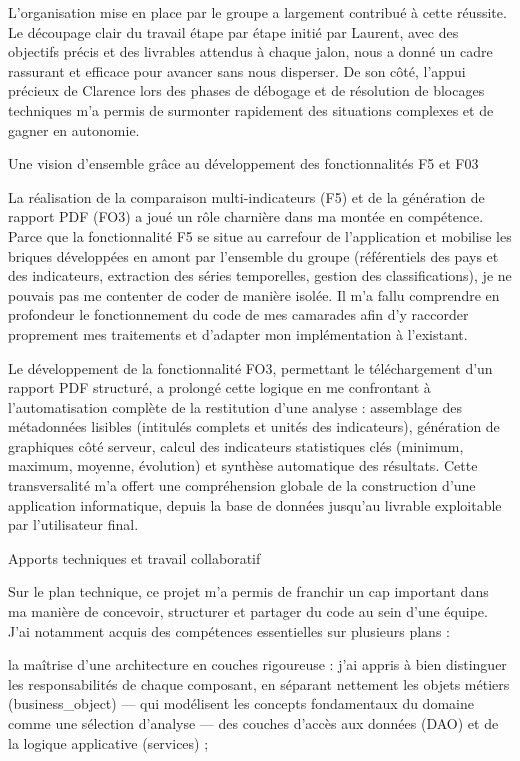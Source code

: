 \documentclass[
  french,
  12pt,
  letterpaper,
  DIV=11,
  numbers=noendperiod]{scrartcl}
\begin{document}
L'organisation mise en place par le groupe a largement contribué à cette
réussite. Le découpage clair du travail étape par étape initié par
Laurent, avec des objectifs précis et des livrables attendus à chaque
jalon, nous a donné un cadre rassurant et efficace pour avancer sans
nous disperser. De son côté, l'appui précieux de Clarence lors des
phases de débogage et de résolution de blocages techniques m'a permis de
surmonter rapidement des situations complexes et de gagner en autonomie.

Une vision d'ensemble grâce au développement des fonctionnalités F5 et
F03

La réalisation de la comparaison multi-indicateurs (F5) et de la
génération de rapport PDF (FO3) a joué un rôle charnière dans ma montée
en compétence. Parce que la fonctionnalité F5 se situe au carrefour de
l'application et mobilise les briques développées en amont par
l'ensemble du groupe (référentiels des pays et des indicateurs,
extraction des séries temporelles, gestion des classifications), je ne
pouvais pas me contenter de coder de manière isolée. Il m'a fallu
comprendre en profondeur le fonctionnement du code de mes camarades afin
d'y raccorder proprement mes traitements et d'adapter mon implémentation
à l'existant.

Le développement de la fonctionnalité FO3, permettant le téléchargement
d'un rapport PDF structuré, a prolongé cette logique en me confrontant à
l'automatisation complète de la restitution d'une analyse : assemblage
des métadonnées lisibles (intitulés complets et unités des indicateurs),
génération de graphiques côté serveur, calcul des indicateurs
statistiques clés (minimum, maximum, moyenne, évolution) et synthèse
automatique des résultats. Cette transversalité m'a offert une
compréhension globale de la construction d'une application informatique,
depuis la base de données jusqu'au livrable exploitable par
l'utilisateur final.

Apports techniques et travail collaboratif

Sur le plan technique, ce projet m'a permis de franchir un cap important
dans ma manière de concevoir, structurer et partager du code au sein
d'une équipe. J'ai notamment acquis des compétences essentielles sur
plusieurs plans :

la maîtrise d'une architecture en couches rigoureuse : j'ai appris à
bien distinguer les responsabilités de chaque composant, en séparant
nettement les objets métiers (business\_object) --- qui modélisent les
concepts fondamentaux du domaine comme une sélection d'analyse --- des
couches d'accès aux données (DAO) et de la logique applicative
(services) ;
\end{document}
